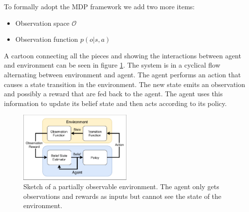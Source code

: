 To formally adopt the MDP framework we add two more items:
\begin{itemize}
    \item Observation space $\mathcal{O}$
    \item Observation function $p(o | s, a)$
\end{itemize}


A cartoon connecting all the pieces and showing the interactions between agent and environment can be seen in figure \ref{fig:background:agentenv}. The system is in a cyclical flow alternating between environment and agent. The agent performs an action that causes a state transition in the environment. The new state emits an observation and possibly a reward that are fed back to the agent. The agent uses this information to update its belief state and then acts according to its policy.

\begin{figure}
  \centering
    \includegraphics[width=0.5\textwidth]{img/background/POMDP}
  \caption{Sketch of a partially observable environment. The agent only gets observations and rewards as inputs but cannot see the state of the environment.}
  \label{fig:background:agentenv}
\end{figure}







